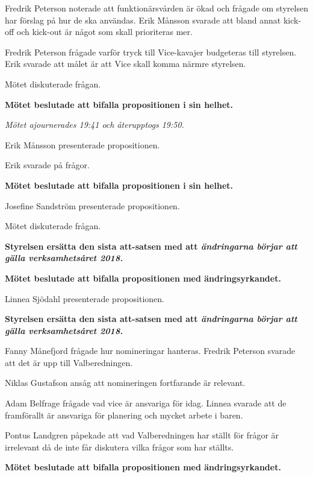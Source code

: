 \documentclass[10pt]{article}
\begin{document}
\begin{paragrafer}
\begin{paragrafer}
        Fredrik Peterson noterade att funktionärsvården är ökad och frågade om styrelsen har förslag på hur de ska användas. Erik Månsson svarade att bland annat kick-off och kick-out är något som skall prioriteras mer.

        Fredrik Peterson frågade varför tryck till Vice-kavajer budgeteras till styrelsen. Erik svarade att målet är att Vice skall komma närmre styrelsen.

        Mötet diskuterade frågan.

        \textbf{Mötet beslutade att bifalla propositionen i sin helhet.}

        \emph{Mötet ajournerades 19:41 och återupptogs 19:50.}

        Erik Månsson presenterade propositionen.

        Erik svarade på frågor.

        \textbf{Mötet beslutade att bifalla propositionen i sin helhet.}

        Josefine Sandström presenterade propositionen.

        Mötet diskuterade frågan.

        \textbf{Styrelsen \ypa ersätta den sista att-satsen med att \emph{ändringarna börjar att gälla verksamhetsåret 2018.}}

        \textbf{Mötet beslutade att bifalla propositionen med ändringsyrkandet.}

        Linnea Sjödahl presenterade propositionen.

        \textbf{Styrelsen \ypa ersätta den sista att-satsen med att \emph{ändringarna börjar att gälla verksamhetsåret 2018.}}

        Fanny Månefjord frågade hur nomineringar hanteras. Fredrik Peterson svarade att det är upp till Valberedningen.

        Niklas Gustafson ansåg att nomineringen fortfarande är relevant.

        Adam Belfrage frågade vad vice är ansvariga för idag. Linnea svarade att de framförallt är ansvariga för planering och mycket arbete i baren.

        Pontus Landgren påpekade att vad Valberedningen har ställt för frågor är irrelevant då de inte får diskutera vilka frågor som har ställts.

        \textbf{Mötet beslutade att bifalla propositionen med ändringsyrkandet.}


\end{paragrafer}
\end{paragrafer}
\end{document}
